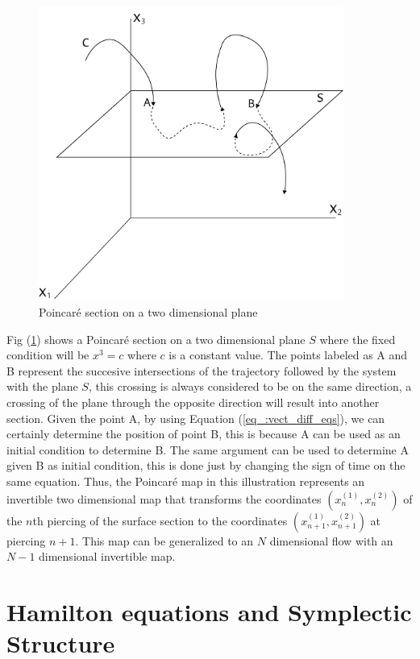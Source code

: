 \begin{figure}[H]
\centering
\includegraphics[width=10cm]{Figures/poincare_scheme.png}
\caption{Poincaré section on a two dimensional plane}
\label{fig:poincare_scheme}
\end{figure}

Fig (\ref{fig:poincare_scheme}) shows a Poincaré section on a two dimensional plane $S$ where the fixed condition will be $x^{3}=c$ where $c$ is a constant value. The points labeled as A and B represent the succesive intersections of the trajectory followed by the system with the plane $S$, this crossing is always considered to be on the same direction, a crossing of the plane through the opposite direction will result into another section. Given the point A, by using Equation (\ref{eq_:vect_diff_eqs}), we can certainly determine the position of point B, this is because A can be used as an initial condition to determine B. The same argument can be used to determine A given B as initial condition, this is done just by changing the sign of time on the same equation. Thus, the Poincaré map in this illustration represents an invertible two dimensional map that transforms the coordinates $(x_n^{(1)},x_n^{(2)})$ of the $n$th piercing of the surface section to the coordinates $(x_{n+1}^{(1)},x_{n+1}^{(2)})$ at piercing $n+1$. This map can be generalized to an $N$ dimensional flow with an $N-1$ dimensional invertible map.

\section{Hamilton equations and Symplectic Structure}


